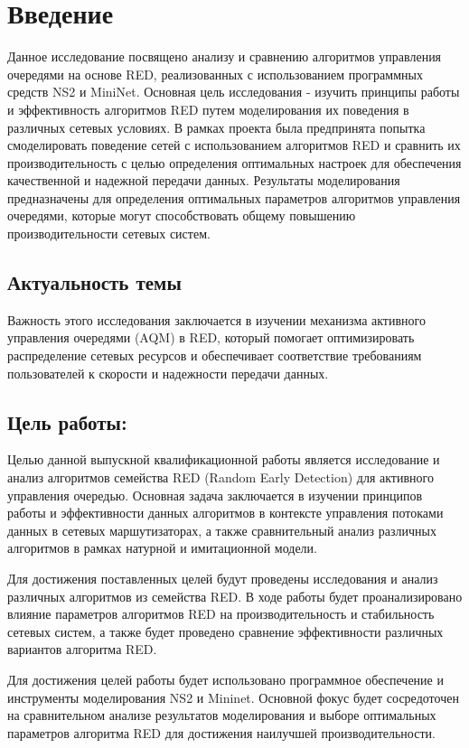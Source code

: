 \chapter*{Введение}

Данное исследование посвящено анализу и сравнению алгоритмов управления
очередями на основе RED, реализованных с использованием программных средств NS2
и MiniNet. Основная цель исследования - изучить принципы работы и эффективность
алгоритмов RED путем моделирования их поведения в различных сетевых условиях. В
рамках проекта была предпринята попытка смоделировать поведение сетей с
использованием алгоритмов RED и сравнить их производительность с целью
определения оптимальных настроек для обеспечения качественной и надежной
передачи данных. Результаты моделирования предназначены для определения
оптимальных параметров алгоритмов управления очередями, которые могут
способствовать общему повышению производительности сетевых систем.

\section*{Актуальность  темы}

Важность этого исследования заключается в изучении механизма активного
управления очередями (AQM) в RED, который помогает оптимизировать распределение
сетевых ресурсов и обеспечивает соответствие требованиям пользователей к
скорости и надежности передачи данных. 

\section*{Цель работы:}
Целью данной выпускной квалификационной работы является исследование и анализ
алгоритмов семейства RED (Random Early Detection) для активного управления
очередью. Основная задача заключается в изучении принципов работы и
эффективности данных алгоритмов в контексте управления потоками данных в
сетевых маршутизаторах, а также сравнительный анализ различных алгоритмов в
рамках натурной и имитационной модели.

Для достижения поставленных целей будут проведены исследования и анализ
различных алгоритмов из семейства RED. В ходе работы будет проанализировано
влияние параметров алгоритмов RED на производительность и стабильность сетевых
систем, а также будет проведено сравнение эффективности различных вариантов
алгоритма RED.

Для достижения целей работы будет использовано программное обеспечение и
инструменты моделирования NS2 и Mininet. Основной фокус будет сосредоточен на
сравнительном анализе результатов моделирования и выборе оптимальных параметров
алгоритма RED для достижения наилучшей производительности.


